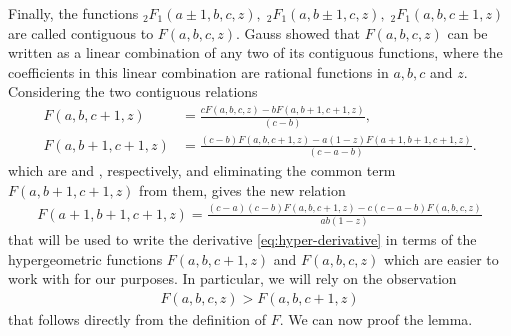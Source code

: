 \documentclass[11pt]{article}
\begin{document}
Finally, the functions
$
_2F_1 (a \pm 1,b, c, z), \; {}_2F_1 (a,b \pm 1, c ,z), \;{}_2F_1 (a,b,c \pm 1,z)
$
are called contiguous to $F(a,b,c,z)$. Gauss showed that $F(a,b,c,z)$ can be written as a linear combination of any two of its contiguous functions, where the coefficients in this linear combination are rational functions in $a,b,c$ and $z$. Considering the two contiguous relations 
   \begin{align*}
        F\left(a,b,c+1,z\right)&=\frac{cF\left(a,b,c,z\right)-bF\left(a,b+1,c+1,z\right)}{\left(c-b\right)},\\
        F\left(a,b+1,c+1,z\right)&=\frac{\left(c-b\right)F\left(a,b,c+1,z\right)-a\left(1-z\right)F\left(a+1,b+1,c+1,z\right)}{\left(c-a-b\right)}.
    \end{align*}
which are \cite[Equation 15.2.24]{abramowitz1948handbook} and \cite[Equation 15.2.15]{abramowitz1948handbook}, respectively, and eliminating the common term $F\left(a,b+1,c+1,z\right)$ from them, gives the new relation
\begin{align}
 F(a+1,b+1,c+1,z)=\frac{(c-a)(c-b)F(a,b,c+1,z)-c(c-a-b)F(a,b,c,z)}{ab(1-z)}
       \label{eq:hyper-contiguous}
\end{align}
that will be used to write the derivative \eqref{eq:hyper-derivative} in terms of the hypergeometric functions $F(a,b,c+1,z)$ and $F(a,b,c,z)$ which are easier to work with for our purposes. In particular, we will rely on the observation  
\begin{align}
F(a,b,c,z) > F(a,b,c+1,z)
       \label{eq:hyper-c-monotone}
\end{align}
that follows directly from the definition of $F$. We can now proof the lemma.
\end{document}
